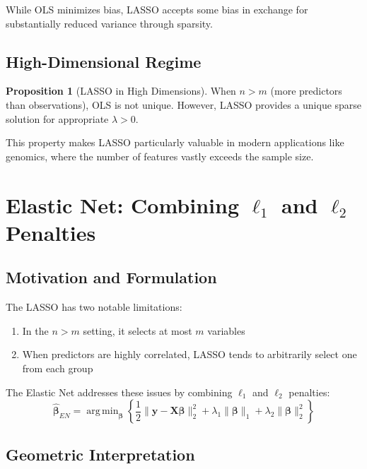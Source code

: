 \documentclass[12pt]{article}
\renewcommand{\vec}[1]{\mathbf{#1}}
\DeclareMathOperator{\argmin}{arg\,min}
\theoremstyle{definition}
\newtheorem{proposition}[theorem]{Proposition}
\begin{document}
While OLS minimizes bias, LASSO accepts some bias in exchange for substantially reduced variance through sparsity.

\subsection{High-Dimensional Regime}

\begin{proposition}[LASSO in High Dimensions]
    \label{prop:high_dim}
    When $n > m$ (more predictors than observations), OLS is not unique. However, LASSO provides a unique sparse solution for appropriate $\lambda > 0$.
\end{proposition}

This property makes LASSO particularly valuable in modern applications like genomics, where the number of features vastly exceeds the sample size.

\newpage

\section{Elastic Net: Combining $\ell_1$ and $\ell_2$ Penalties}

\subsection{Motivation and Formulation}

The LASSO has two notable limitations:
\begin{enumerate}
    \item In the $n > m$ setting, it selects at most $m$ variables
    \item When predictors are highly correlated, LASSO tends to arbitrarily select one from each group
\end{enumerate}

The Elastic Net addresses these issues by combining $\ell_1$ and $\ell_2$ penalties:
\begin{equation}
    \hat{\vec{\beta}}_{EN} = \argmin_{\vec{\beta}} \left\{\frac{1}{2}\|\vec{y} - \vec{X}\vec{\beta}\|_2^2 + \lambda_1\|\vec{\beta}\|_1 + \lambda_2\|\vec{\beta}\|_2^2\right\}
    \label{eq:elastic_net}
\end{equation}

\subsection{Geometric Interpretation}
\end{document}
